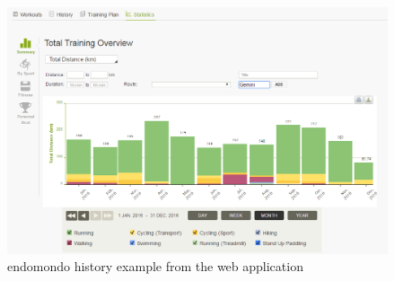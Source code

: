 \begin{figure}[h]
    \includegraphics[width=\textwidth]{Images/endomondo-history-example.png}
    \caption{endomondo history example from the web application\cite{endomondo-history-img}}
\end{figure}

